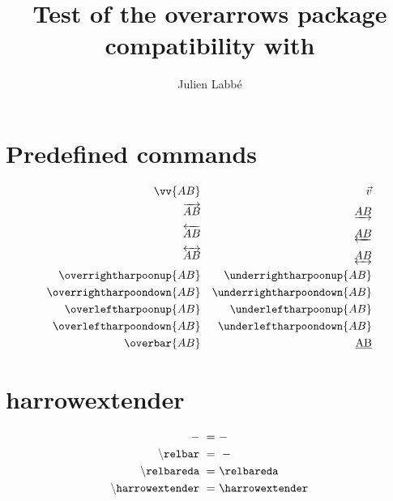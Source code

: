 \documentclass{article}
\title{Test of the \textsf{overarrows} package\\compatibility with \pkg{unicode-math}}
\author{Julien Labb\'e}
\begin{document}
\maketitle

\section*{Predefined commands}

\begin{dispExample}
\begin{align*}
  \vv{AB}                   &  & \vec{v}                    \\
  \overrightarrow{AB}       &  & \underrightarrow{AB}       \\
  \overleftarrow{AB}        &  & \underleftarrow{AB}        \\
  \overleftrightarrow{AB}   &  & \underleftrightarrow{AB}   \\
  \overrightharpoonup{AB}   &  & \underrightharpoonup{AB}   \\
  \overrightharpoondown{AB} &  & \underrightharpoondown{AB} \\
  \overleftharpoonup{AB}    &  & \underleftharpoonup{AB}    \\
  \overleftharpoondown{AB}  &  & \underleftharpoondown{AB}  \\
  \overbar{AB}              &  & \underbar{AB}
\end{align*}
\end{dispExample}

\section*{harrowextender}

\begin{dispExample}
  \begin{align*}
    \mathtt{-} ~=~                         & - \\
    \mathtt{\backslash relbar} ~=~        & \relbar \\
    \mathtt{\backslash relbareda} ~=~      & \relbareda \\
    \mathtt{\backslash harrowextender} ~=~ & \harrowextender
  \end{align*}
\end{dispExample}

\begin{dispExample}
\end{dispExample}
\end{document}
